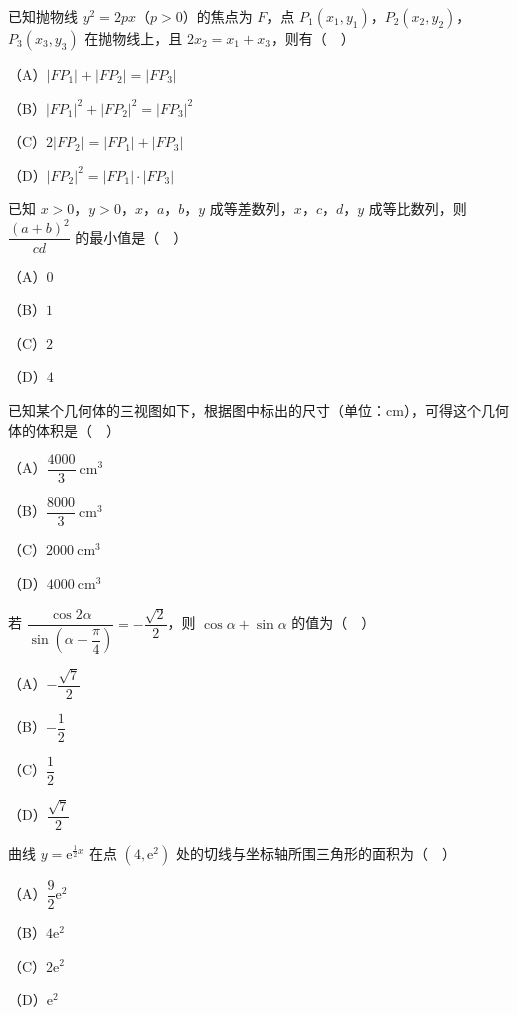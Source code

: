 \begin{question}
已知抛物线 $y^2=2px$（$p>0$）的焦点为 $F$，点 $P_1(x_1,y_1)$，$P_2(x_2,y_2)$，$P_3(x_3,y_3)$ 在抛物线上，且 $2x_2=x_1+x_3$，则有（　）

（A）$|FP_1|+|FP_2|=|FP_3|$

（B）$|FP_1|^2+|FP_2|^2=|FP_3|^2$

（C）$2|FP_2|=|FP_1|+|FP_3|$

（D）$|FP_2|^2=|FP_1|\cdot|FP_3|$

\end{question}
\begin{question}
已知 $x>0$，$y>0$，$x$，$a$，$b$，$y$ 成等差数列，$x$，$c$，$d$，$y$ 成等比数列，则 $\dfrac{(a+b)^2}{cd}$ 的最小值是（　）

（A）$0$

（B）$1$

（C）$2$

（D）$4$

\Needspace{0.4\textheight}
\end{question}
\begin{question}
已知某个几何体的三视图如下，根据图中标出的尺寸（单位：$\mathrm{cm}$），可得这个几何体的体积是（　）
\nopagebreak[4]
\begin{center}\end{center}
\nopagebreak[4]
（A）$\dfrac{4000}{3}\ \mathrm{cm^3}$

（B）$\dfrac{8000}{3}\ \mathrm{cm^3}$

（C）$2000\ \mathrm{cm^3}$

（D）$4000\ \mathrm{cm^3}$

\end{question}
\begin{question}
若 $\dfrac{\cos2\alpha}{\sin\left(\alpha-\dfrac{\pi}{4}\right)}=-\dfrac{\sqrt2}{2}$，则 $\cos\alpha+\sin\alpha$ 的值为（　）

（A）$-\dfrac{\sqrt7}{2}$

（B）$-\dfrac12$

（C）$\dfrac12$

（D）$\dfrac{\sqrt7}{2}$

\end{question}
\begin{question}
曲线 $y=\mathrm e^{\frac12x}$ 在点 $(4,\mathrm e^2)$ 处的切线与坐标轴所围三角形的面积为（　）

（A）$\dfrac92\mathrm e^2$

（B）$4\mathrm e^2$

（C）$2\mathrm e^2$

（D）$\mathrm e^2$

\end{question}
